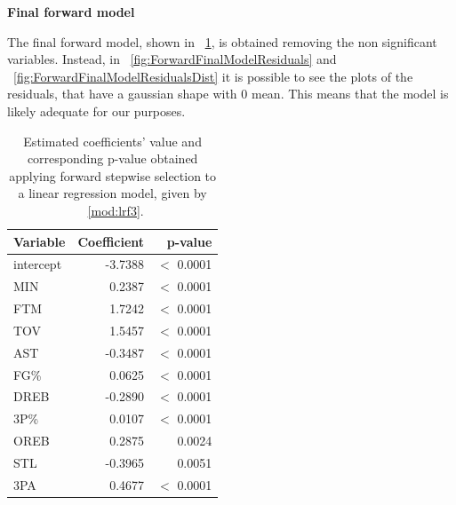 \noindent
\textbf{Final forward model}

The final forward model, shown in \Tab~\ref{table:ForwardFinalModelSummary}, is obtained removing the non significant variables. Instead, in \Fig~\ref{fig:ForwardFinalModelResiduals} and \Fig~\ref{fig:ForwardFinalModelResidualsDist} it is possible to see the plots of the residuals, that have a gaussian shape with 0 mean. This means that the model is likely adequate for our purposes.

\begin{center}
\end{center}

\begin{table}[h]
	\centering
	\begin{tabular}{|| l | r | r ||} 
		\hline
		Variable & Coefficient & p-value \\
		\hline
		\hline
		intercept & -3.7388 & $<$ 0.0001 \\
		MIN & 0.2387 & $<$ 0.0001 \\
		FTM & 1.7242 & $<$ 0.0001 \\
		TOV & 1.5457 & $<$ 0.0001 \\
		AST & -0.3487 & $<$ 0.0001 \\
		FG\% & 0.0625 & $<$ 0.0001 \\
		DREB & -0.2890 & $<$ 0.0001 \\
		3P\% & 0.0107 & $<$ 0.0001 \\
		OREB & 0.2875 & 0.0024 \\
		STL & -0.3965 & 0.0051 \\
		3PA & 0.4677 & $<$ 0.0001 \\
		\hline
	\end{tabular}
	\caption{Estimated coefficients' value and corresponding p-value obtained applying forward stepwise selection to a linear regression model, given by \Mod~\ref{mod:lrf3}.}
	\label{table:ForwardFinalModelSummary}
\end{table}

